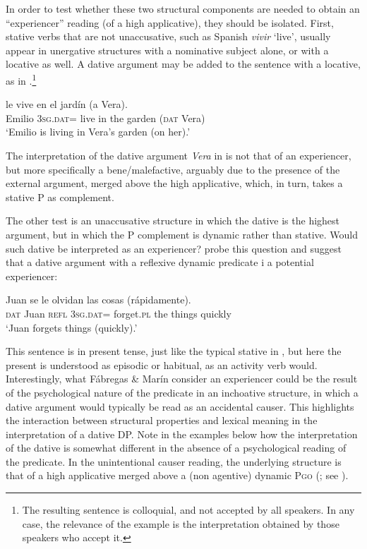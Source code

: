 \documentclass[output=paper,colorlinks,citecolor=brown,nonflat]{./langscibook}
\begin{document}
In order to test whether these two structural components are needed to obtain an “experiencer” reading (of a high applicative), they should be isolated. First, stative verbs that are not unaccusative, such as Spanish \textit{vivir} ‘live’, usually appear in unergative structures with a nominative subject alone, or with a locative as well. A dative argument may be added to the sentence with a locative, as in .\footnote{The resulting sentence is colloquial, and not accepted by all speakers. In any case, the relevance of the example is the interpretation obtained by those speakers who accept it.}

\ea%
    \label{ex:cuervo:20}
     {le} {vive} {en} {el} {jardín} ({a} {Vera}).\\
    Emilio 3\textsc{sg.dat}= live in the garden (\textsc{dat}  Vera)\\
    \glt ‘Emilio is living in Vera’s garden (on her).’
    \z

The interpretation of the dative argument \textit{Vera} in  is not that of an experiencer, but more specifically a bene/malefactive, arguably due to the presence of the external argument, merged above the high applicative, which, in turn, takes a stative \liv P as complement.

The other test is an unaccusative structure in which the dative is the highest argument, but in which the \liv P complement is dynamic rather than stative. Would such dative be interpreted as an experiencer?  probe this question and suggest that a dative argument with a reflexive dynamic predicate i a potential experiencer:

\ea%
    \label{ex:cuervo:21}
     {Juan} {se} {le} {olvidan} {las} {cosas} {(rápidamente)}.\\
    \textsc{dat} Juan  \textsc{refl} 3\textsc{sg.dat}= forget.\textsc{pl} the things quickly\\
    \glt ‘Juan forgets things (quickly).'
    \z

This sentence is in present tense, just like the typical stative in , but here the present is understood as episodic or habitual, as an activity verb would. Interestingly, what Fábregas \& Marín consider an experiencer could be the result of the psychological nature of the predicate in an inchoative structure, in which a dative argument would typically be read as an accidental causer. This highlights the interaction between structural properties and lexical meaning in the interpretation of a dative DP. Note in the examples below how the interpretation of the dative is somewhat different in the absence of a psychological reading of the predicate. In the unintentional causer reading, the underlying structure is that of a high applicative merged above a (non agentive) dynamic \liv P\textsc{go} (\citealt{Cuervo2003,Cuervo2014,Schäfer2008}; see ).
\end{document}
